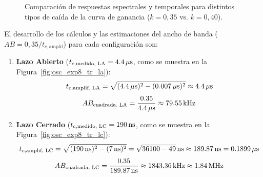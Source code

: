 \begin{figure}[!ht]
    \caption{Comparación de respuestas espectrales y temporales para distintos tipos de caída de la curva de ganancia ($k = 0,35$ vs. $k = 0,40$).}
    \label{fig:comparacion_k_sobreimpulso}
\end{figure}

El desarrollo de los cálculos y las estimaciones del ancho de banda ($AB = 0,35 / t_{c,\text{amplif}}$) para cada configuración son:
\begin{enumerate}
    \item \textbf{Lazo Abierto} ($t_{c,\text{medido, LA}} = 4.4\,\mathrm{\mu s}$, como se muestra en la Figura~\ref{fig:osc_exp8_tr_la}):
          \begin{equation}
              t_{c,\text{amplif, LA}} = \sqrt{(4.4\,\mathrm{\mu s})^2 - (0.007\,\mathrm{\mu s})^2} \approx 4.4\,\mathrm{\mu s}
          \end{equation}
          \begin{equation}
              AB_{\text{cuadrada, LA}} = \frac{0.35}{4.4\,\mathrm{\mu s}} \approx 79.55\,\mathrm{kHz}
          \end{equation}
    \item \textbf{Lazo Cerrado} ($t_{c,\text{medido, LC}} = 190\,\mathrm{ns}$, como se muestra en la Figura~\ref{fig:osc_exp8_tr_lc}):
          \begin{equation}
              t_{c,\text{amplif, LC}} = \sqrt{(190\,\mathrm{ns})^2 - (7\,\mathrm{ns})^2} = \sqrt{36100 - 49}\,\mathrm{ns} \approx 189.87\,\mathrm{ns} = 0.1899\,\mathrm{\mu s}
          \end{equation}
          \begin{equation}
              AB_{\text{cuadrada, LC}} = \frac{0.35}{189.87\,\mathrm{ns}} \approx 1843.36\,\mathrm{kHz} \approx 1.84\,\mathrm{MHz}
          \end{equation}
\end{enumerate}

